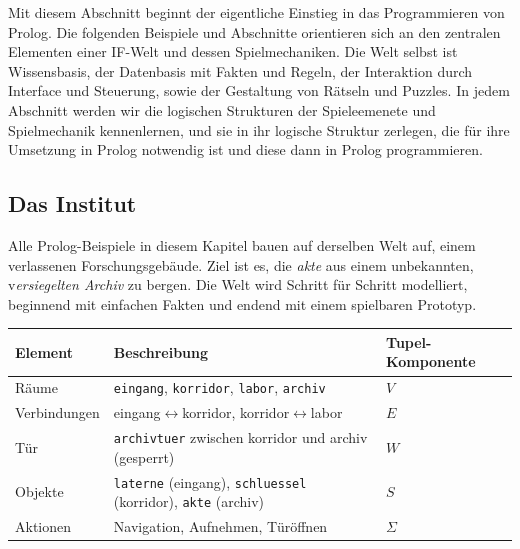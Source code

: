 \documentclass[parskip=half,a4paper,11pt]{scrreprt}
\begin{document}
Mit diesem Abschnitt beginnt der eigentliche Einstieg in das Programmieren von Prolog. Die folgenden Beispiele und Abschnitte orientieren sich an den zentralen Elementen einer IF-Welt und dessen Spielmechaniken. Die Welt selbst ist Wissensbasis, der Datenbasis mit Fakten und Regeln, der Interaktion durch Interface und Steuerung, sowie der Gestaltung von Rätseln und Puzzles. In jedem Abschnitt werden wir die logischen Strukturen der Spieleemenete und Spielmechanik kennenlernen, und sie in ihr logische Struktur zerlegen, die für ihre Umsetzung in Prolog notwendig ist und diese dann in Prolog programmieren.

\subsection{ Das Institut}

Alle Prolog-Beispiele in diesem Kapitel bauen auf derselben Welt auf, einem verlassenen Forschungsgebäude. Ziel ist es, die \textit{akte} aus einem unbekannten, v\textit{ersiegelten Archiv} zu bergen. Die Welt wird Schritt für Schritt modelliert, beginnend mit einfachen Fakten und endend mit einem spielbaren Prototyp.

\begin{center}
\begin{tabular}{lll}
\toprule
\textbf{Element} & \textbf{Beschreibung} & \textbf{Tupel-Komponente} \\
\midrule
Räume & \texttt{eingang}, \texttt{korridor}, \texttt{labor}, \texttt{archiv} & $V$ \\
Verbindungen & eingang$\leftrightarrow$korridor, korridor$\leftrightarrow$labor & $E$ \\
Tür & \texttt{archivtuer} zwischen korridor und archiv (gesperrt) & $W$ \\
Objekte & \texttt{laterne} (eingang), \texttt{schluessel} (korridor), \texttt{akte} (archiv) & $S$ \\
Aktionen & Navigation, Aufnehmen, Türöffnen & $\Sigma$ \\
\bottomrule
\end{tabular}
\end{center}
\end{document}
